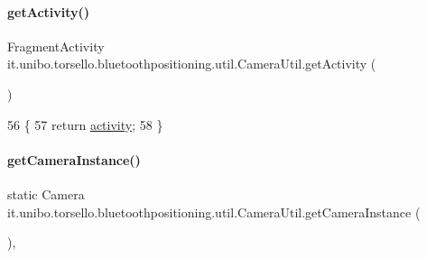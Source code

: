 \paragraph{\texorpdfstring{get\+Activity()}{getActivity()}}
{\footnotesize\ttfamily Fragment\+Activity it.\+unibo.\+torsello.\+bluetoothpositioning.\+util.\+Camera\+Util.\+get\+Activity (\begin{DoxyParamCaption}{ }\end{DoxyParamCaption})}


\begin{DoxyCode}
56                                           \{
57         \textcolor{keywordflow}{return} \hyperlink{classit_1_1unibo_1_1torsello_1_1bluetoothpositioning_1_1util_1_1CameraUtil_a06e6b6842aa57e9e9db83a88b4aa3f25_a06e6b6842aa57e9e9db83a88b4aa3f25}{activity};
58     \}
\end{DoxyCode}
\hypertarget{classit_1_1unibo_1_1torsello_1_1bluetoothpositioning_1_1util_1_1CameraUtil_afd1bf5fd806ad3dd71463e2f0084b619_afd1bf5fd806ad3dd71463e2f0084b619}{}\label{classit_1_1unibo_1_1torsello_1_1bluetoothpositioning_1_1util_1_1CameraUtil_afd1bf5fd806ad3dd71463e2f0084b619_afd1bf5fd806ad3dd71463e2f0084b619} 
\paragraph{\texorpdfstring{get\+Camera\+Instance()}{getCameraInstance()}}
{\footnotesize\ttfamily static Camera it.\+unibo.\+torsello.\+bluetoothpositioning.\+util.\+Camera\+Util.\+get\+Camera\+Instance (\begin{DoxyParamCaption}{ }\end{DoxyParamCaption})\hspace{0.3cm}{\ttfamily [static]}, {\ttfamily [private]}}

